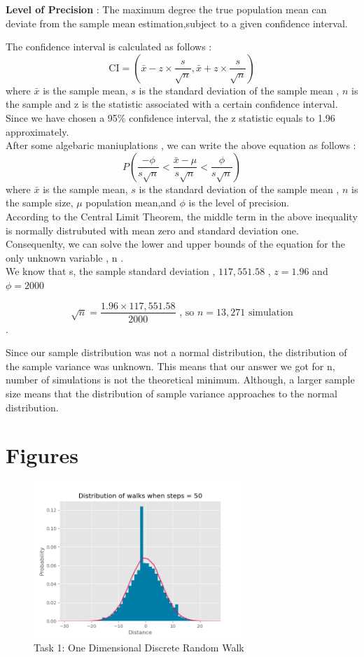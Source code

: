 \documentclass[a4paper, 11pt]{book} %
\begin{document}
\textbf{Level of Precision} : The maximum degree the true population mean can deviate from the sample mean estimation,subject to a given
confidence interval.

The confidence interval is calculated as follows :
$$ \text{CI} = (\bar{x} - z \times \frac{s}{\sqrt{n}},\bar{x} + z \times \frac{s}{\sqrt{n}} )$$ 
where $\bar{x}$ is the sample mean, $s$ is the standard deviation of the sample mean , $n$ is the sample and z is the statistic associated with a certain 
confidence interval. Since we have chosen a 95\% confidence interval, the z statistic equals to 1.96
approximately. \\

After some algebaric maniuplations , we can write the above equation as follows :
$$P(\frac{-\phi}{s\sqrt{n}}<\frac{\bar{x}-\mu}{s\sqrt{n}}<\frac{\phi}{s\sqrt{n}})$$
where $\bar{x}$ is the sample mean, $s$ is the standard deviation of the sample mean , $n$ is the sample size, $\mu$ population mean,and $\phi$
is the level of precision. \\

According to the Central Limit Theorem, the middle term in the above inequality is normally
distrubuted with mean zero and standard deviation one. Consequenlty, we can solve the lower and upper
bounds of the equation for the only unknown variable , n . \\

We know that s, the sample standard deviation , $ 117,551.58$ , $z = 1.96$ and $\phi = 2000$

$$ \sqrt{n} = \frac{1.96 \times 117,551.58}{2000} \text{ , so } n = 13,271 \text{ simulation} $$.

Since our sample distribution was not a normal distribution, the distribution of the sample variance was unknown. This means
that our answer we got for n, number of simulations is not the theoretical minimum. Although, a larger sample size means that the
distribution of sample variance approaches to the normal distribution.




 
\newpage
\section*{Figures}
\begin{figure}[h]
	\centering
	\includegraphics[width=0.7\textwidth]{Task 1.png}
	\caption{Task 1: One Dimensional Discrete Random Walk}
	\label{fig:task1}
\end{figure}
\end{document}
